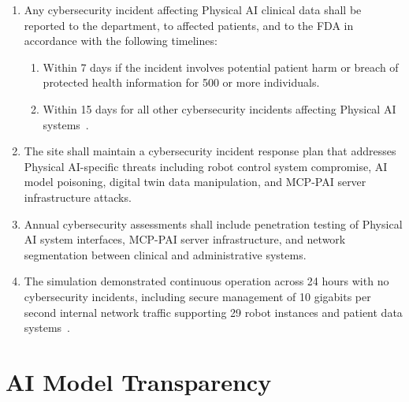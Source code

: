 \documentclass[11pt,letterpaper]{article}
\begin{document}
\begin{enumerate}[label=(\alph*)]
\item Any cybersecurity incident affecting Physical AI clinical data shall be
  reported to the department, to affected patients, and to the FDA in
  accordance with the following timelines:
  \begin{enumerate}[label=(\arabic*)]
  \item Within 7 days if the incident involves potential patient harm or
    breach of protected health information for 500 or more individuals.
  \item Within 15 days for all other cybersecurity incidents affecting Physical
    AI systems~\cite{cfr312adapt}.
  \end{enumerate}

\item The site shall maintain a cybersecurity incident response plan that
  addresses Physical AI-specific threats including robot control system
  compromise, AI model poisoning, digital twin data manipulation, and
  MCP-PAI server infrastructure attacks.

\item Annual cybersecurity assessments shall include penetration testing of
  Physical AI system interfaces, MCP-PAI server infrastructure, and network
  segmentation between clinical and administrative systems.

\item The simulation demonstrated continuous operation across 24 hours with no
  cybersecurity incidents, including secure management of 10 gigabits per
  second internal network traffic supporting 29 robot instances and patient
  data systems~\cite{sitespec2026}.
\end{enumerate}

\section{AI Model Transparency}
\end{document}
